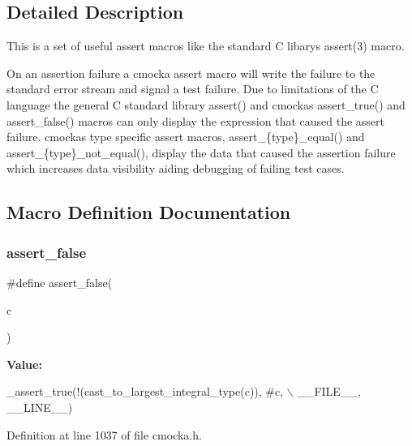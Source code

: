 \subsection{Detailed Description}
This is a set of useful assert macros like the standard C libary\textquotesingle{}s assert(3) macro.

On an assertion failure a cmocka assert macro will write the failure to the standard error stream and signal a test failure. Due to limitations of the C language the general C standard library assert() and cmocka\textquotesingle{}s assert\+\_\+true() and assert\+\_\+false() macros can only display the expression that caused the assert failure. cmocka\textquotesingle{}s type specific assert macros, assert\+\_\+\{type\}\+\_\+equal() and assert\+\_\+\{type\}\+\_\+not\+\_\+equal(), display the data that caused the assertion failure which increases data visibility aiding debugging of failing test cases. 

\subsection{Macro Definition Documentation}
\mbox{\label{group__cmocka__asserts_ga4ca6064e99d5a865b1b7f79391ffba68}} 
\subsubsection{\texorpdfstring{assert\+\_\+false}{assert\_false}}
{\footnotesize\ttfamily \#define assert\+\_\+false(\begin{DoxyParamCaption}\item[{}]{c }\end{DoxyParamCaption})}

{\bfseries Value\+:}
\begin{DoxyCode}
\_assert\_true(!(cast\_to\_largest\_integral\_type(c)), #c, \(\backslash\)
                                     \_\_FILE\_\_, \_\_LINE\_\_)
\end{DoxyCode}


Definition at line 1037 of file cmocka.\+h.

\mbox{\label{group__cmocka__asserts_ga448ed2ee603a3be404ac7ea6a6096d09}} 
